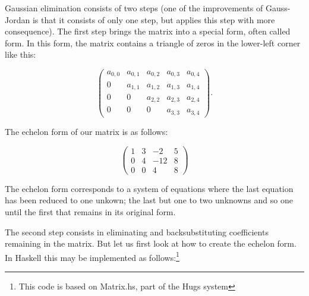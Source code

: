 \documentclass[tikz]{scrreprt}
\begin{document}
Gaussian elimination consists of two steps
(one of the improvements of Gauss-Jordan is
 that it consists of only one step,
 but applies this step with more consequence).
The first step brings the matrix into a special form,
often called  form.
In this form, the matrix contains a triangle
of zeros in the lower-left corner like this:

\[
\begin{pmatrix}
a_{0,0} & a_{0,1} & a_{0,2} & a_{0,3} & a_{0,4} \\
0       & a_{1,1} & a_{1,2} & a_{1,3} & a_{1,4} \\
0       & 0       & a_{2,2} & a_{2,3} & a_{2,4} \\
0       & 0       & 0       & a_{3,3} & a_{3,4}
\end{pmatrix}.
\]

The echelon form of our matrix is as follows:

\[
\begin{pmatrix}
1 & 3 & -2  & 5\\
0 & 4 & -12 & 8\\
0 & 0 &   4 & 8
\end{pmatrix}
\]

The echelon form corresponds to a system of equations
where the last equation has been reduced to one unkown;
the last but one to two unknowns and so one until
the first that remains in its original form.

The second step consists in eliminating and
backsubstituting coefficients remaining in
the matrix. But let us first look 
at how to create the echelon form.
In Haskell this may be implemented as follows:\footnote{
This code is based on Matrix.hs, part of the Hugs system}
\end{document}

